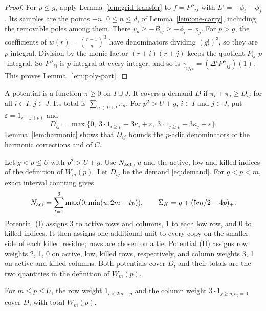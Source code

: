 \begin{proof}
For \(p\le g\), apply Lemma~\ref{lem:grid-transfer} to \(f=P''_{ij}\) with \(L'=-\phi_i-\phi_j\). Its samples are the points \(-n\), \(0\le n\le d\), of Lemma~\ref{lem:one-carry}, including the removable poles among them. There \(v_p\ge-B_{ij}\ge-\phi_i-\phi_j\). For \(p>g\), the coefficients of \(w(r)=\binom{r-1}{g}^3\) have denominators dividing \((g!)^3\), so they are \(p\)-integral. Division by the monic factor \((r+i)(r+j)\) keeps the quotient \(P_{ij}\) \(p\)-integral. So \(P''_{ij}\) is \(p\)-integral at every integer, and so is \(\gamma_{ij,\iota}=(\Delta^\iota P''_{ij})(1)\). This proves Lemma~\ref{lem:poly-part}.
\end{proof}

A potential is a function \(\pi\ge0\) on \(I\cup J\). It covers a demand \(D\) if \(\pi_i+\pi_j\ge D_{ij}\) for all \(i\in I\), \(j\in J\). Its total is \(\sum_{n\in I\cup J}\pi_n\). For \(p^2>U+g\), \(i\in I\) and \(j\in J\), put \(\varepsilon=1_{i\equiv j\,(p)}\) and
\begin{equation}\label{eq:demand}
 D_{ij}=\max\{0,\ 3\cdot1_{i\ge p}-3\kappa_i+\varepsilon,\
                    3\cdot1_{j\ge p}-3\kappa_j+\varepsilon\}.
\end{equation}
Lemma~\ref{lem:harmonic} shows that \(D_{ij}\) bounds the \(p\)-adic denominators of the harmonic corrections and of \(C\).

\begin{lemma}\label{lem:moving}
Let \(g<p\le U\) with \(p^2>U+g\). Use \(N_{\rm act}\), \(u\) and the active, low and killed indices of the definition of \(W_m(p)\). Let \(D_{ij}\) be the demand \eqref{eq:demand}. For \(g<p<m\), exact interval counting gives
\[
 N_{\rm act}=\sum_{t=1}^{3}\max(0,\min(u,2m-tp)),\qquad
 \Sigma_K=g+(5m/2-4p)_+ .
\]
Potential (I) assigns 3 to active rows and columns, 1 to each low row, and 0 to killed indices. It then assigns one additional unit to every copy on the smaller side of each killed residue; rows are chosen on a tie. Potential (II) assigns row weights 2, 1, 0 on active, low, killed rows, respectively, and column weights 3, 1 on active and killed columns. Both potentials cover \(D\), and their totals are the two quantities in the definition of \(W_m(p)\).

For \(m\le{}p\le{}U\), the row weight \(1_{i<2m-p}\) and the column weight \(3\cdot1_{j\ge p,\kappa_j=0}\) cover \(D\), with total \(W_m(p)\).
\end{lemma}

